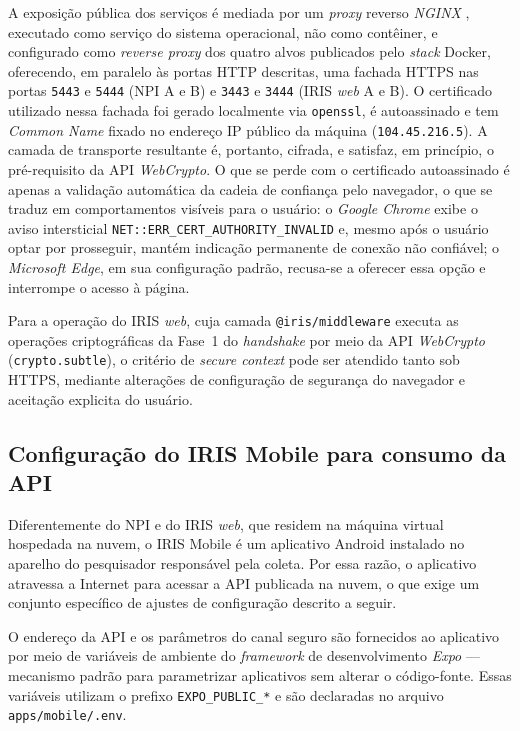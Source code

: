 A exposição pública dos serviços é mediada por um \textit{proxy} reverso \textit{NGINX} \cite{nginxDocs}, executado como serviço do sistema operacional, não como contêiner, e configurado como \emph{reverse proxy} dos quatro alvos publicados pelo \textit{stack} Docker, oferecendo, em paralelo às portas HTTP descritas, uma fachada HTTPS nas portas \texttt{5443} e \texttt{5444} (NPI A e B) e \texttt{3443} e \texttt{3444} (IRIS \emph{web} A e B). O certificado utilizado nessa fachada foi gerado localmente via \texttt{openssl}, é autoassinado e tem \emph{Common Name} fixado no endereço IP público da máquina (\texttt{104.45.216.5}). A camada de transporte resultante é, portanto, cifrada, e satisfaz, em princípio, o pré-requisito da API \textit{WebCrypto}. O que se perde com o certificado autoassinado é apenas a validação automática da cadeia de confiança pelo navegador, o que se traduz em comportamentos visíveis para o usuário: o \textit{Google Chrome} exibe o aviso intersticial \texttt{NET::ERR\_CERT\_AUTHORITY\_INVALID} e, mesmo após o usuário optar por prosseguir, mantém indicação permanente de conexão não confiável; o \textit{Microsoft Edge}, em sua configuração padrão, recusa-se a oferecer essa opção e interrompe o acesso à página.

Para a operação do IRIS \emph{web}, cuja camada \texttt{@iris/middleware} executa as operações criptográficas da Fase~1 do \textit{handshake} por meio da API \textit{WebCrypto} (\texttt{crypto.subtle}), o critério de \emph{secure context} pode ser atendido tanto sob HTTPS, mediante alterações de configuração de segurança do navegador e aceitação explicita do usuário.

\subsection{Configuração do IRIS Mobile para consumo da API}\label{subsec:DeployMobile}
Diferentemente do NPI e do IRIS \emph{web}, que residem na máquina virtual hospedada na nuvem, o IRIS Mobile é um aplicativo Android instalado no aparelho do pesquisador responsável pela coleta. Por essa razão, o aplicativo atravessa a Internet para acessar a API publicada na nuvem, o que exige um conjunto específico de ajustes de configuração descrito a seguir.

O endereço da API e os parâmetros do canal seguro são fornecidos ao aplicativo por meio de variáveis de ambiente do \emph{framework} de desenvolvimento \emph{Expo} --- mecanismo padrão para parametrizar aplicativos sem alterar o código-fonte. Essas variáveis utilizam o prefixo \texttt{EXPO\_PUBLIC\_*} e são declaradas no arquivo \texttt{apps/mobile/.env}.

